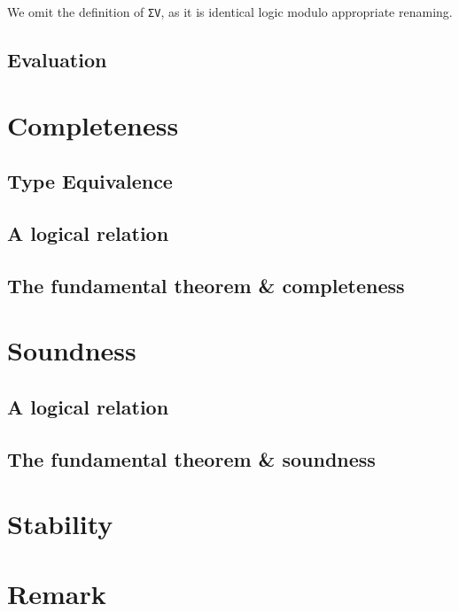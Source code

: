 \documentclass[authoryear, acmsmall, screen, review, nonacm]{acmart}
\begin{document}
\Ni We omit the definition of \verb!ΣV!, as it is identical logic modulo appropriate renaming.

\subsection{Evaluation}

\section{Completeness}

\subsection{Type Equivalence}
\subsection{A logical relation}
\subsection{The fundamental theorem \& completeness}

\section{Soundness}
\subsection{A logical relation}
\subsection{The fundamental theorem \& soundness}

\section{Stability}

\section{Remark}
\end{document}
